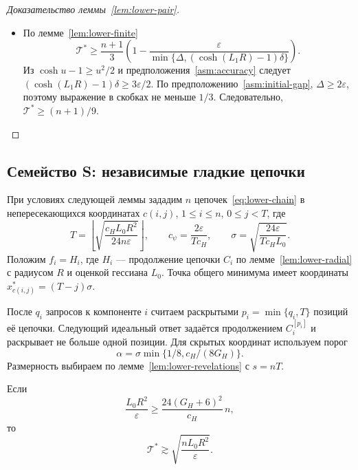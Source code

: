 \begin{proof}[Доказательство леммы~\ref{lem:lower-pair}]
\begin{itemize}
Если при запуске на нулевом входе алгоритм делает бесконечно много запросов, но обращается менее чем к $n-1$ различным
индексам, то на некотором входе семейства число запросов бесконечно,
и требуемая усреднённая оценка также выполнена. Обозначим число запросов на выбранном
входе через $\tau$, а невязку ответа через $\mathcal E$. Тогда
\[
 \frac{\mathbb E_{a,b,s}\tau}{(n+1)/3}
 +\frac{\mathbb E_{a,b,s}\mathcal E}{\min\{\Delta,(\cosh(L_1R)-1)\delta\}}\ge1.
\]
\item По лемме~\ref{lem:lower-finite}
\[
 \mathcal T^\ast\ge\frac{n+1}{3}\left(1-
 \frac\varepsilon{\min\{\Delta,(\cosh(L_1R)-1)\delta\}}\right).
\]
Из $\cosh u-1\ge u^2/2$ и предположения~\ref{asm:accuracy}
следует $(\cosh(L_1R)-1)\delta\ge3\varepsilon/2$.
По предположению~\ref{asm:initial-gap}, $\Delta\ge2\varepsilon$,
поэтому выражение в скобках не меньше $1/3$.
Следовательно, $\mathcal T^\ast\ge(n+1)/9$.
\end{itemize}
\end{proof}

\subsection{Семейство S: независимые гладкие цепочки}

При условиях следующей леммы зададим $n$ цепочек~\eqref{eq:lower-chain}
в непересекающихся координатах $c(i,j)$, $1\le i\le n$, $0\le j<T$, где
\[
 T=\left\lfloor\sqrt{\frac{c_HL_0R^2}{24n\varepsilon}}\right\rfloor,
 \qquad c_\psi=\frac{2\varepsilon}{Tc_H},
 \qquad \sigma=\sqrt{\frac{24\varepsilon}{Tc_HL_0}}.
\]
Положим $f_i=H_i$, где $H_i$ --- продолжение цепочки $C_i$ по лемме~\ref{lem:lower-radial}
с радиусом $R$ и оценкой гессиана $L_0$.
Точка общего минимума имеет координаты
$x^\ast_{c(i,j)}=(T-j)\sigma$.

После $q_i$ запросов к компоненте $i$ считаем раскрытыми
$p_i=\min\{q_i,T\}$ позиций её цепочки. Следующий идеальный ответ
задаётся продолжением $C_i^{[p_i]}$ и раскрывает не больше одной позиции.
Для скрытых координат используем порог
\[
 \alpha=\sigma\min\{1/8,c_H/(8G_H)\}.
\]
Размерность выбираем по лемме~\ref{lem:lower-revelations} с $s=nT$.

\begin{lemma}\label{lem:lower-S}
Если
\begin{equation}\label{eq:lower-S-regime}
 \frac{L_0R^2}{\varepsilon}
 \ge\frac{24(G_H+6)^2}{c_H}\,n,
\end{equation}
то
\begin{equation}\label{eq:lower-S}
 \mathcal T^\ast\gtrsim\sqrt{\frac{nL_0R^2}{\varepsilon}}.
\end{equation}
\end{lemma}

